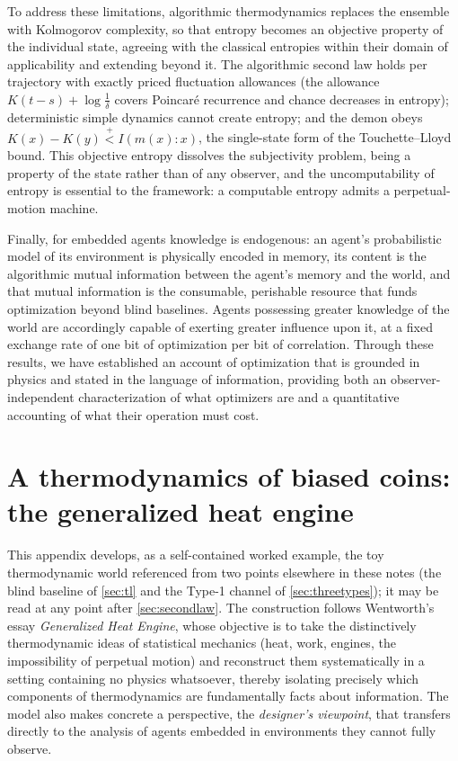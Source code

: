 \documentclass[11pt]{article}
\newcommand{\plt}{\mathrel{\stackrel{+}{<}}}
\begin{document}
To address these limitations, algorithmic thermodynamics replaces the ensemble with Kolmogorov complexity, so that entropy becomes an objective property of the individual state, agreeing with the classical entropies within their domain of applicability and extending beyond it. The algorithmic second law holds per trajectory with exactly priced fluctuation allowances (the allowance $K(t-s) + \log\frac1\delta$ covers Poincar\'e recurrence and chance decreases in entropy); deterministic simple dynamics cannot create entropy; and the demon obeys $K(x) - K(y) \plt I(m(x):x)$, the single-state form of the Touchette--Lloyd bound. This objective entropy dissolves the subjectivity problem, being a property of the state rather than of any observer, and the uncomputability of entropy is essential to the framework: a computable entropy admits a perpetual-motion machine.

Finally, for embedded agents knowledge is endogenous: an agent's probabilistic model of its environment is physically encoded in memory, its content is the algorithmic mutual information between the agent's memory and the world, and that mutual information is the consumable, perishable resource that funds optimization beyond blind baselines. Agents possessing greater knowledge of the world are accordingly capable of exerting greater influence upon it, at a fixed exchange rate of one bit of optimization per bit of correlation. Through these results, we have established an account of optimization that is grounded in physics and stated in the language of information, providing both an observer-independent characterization of what optimizers are and a quantitative accounting of what their operation must cost.

\appendix
\section{A thermodynamics of biased coins: the generalized heat engine}
\label{sec:coins}

This appendix develops, as a self-contained worked example, the toy thermodynamic world referenced from two points elsewhere in these notes (the blind baseline of \cref{sec:tl} and the Type-1 channel of \cref{sec:threetypes}); it may be read at any point after \cref{sec:secondlaw}. The construction follows Wentworth's essay \emph{Generalized Heat Engine}, whose objective is to take the distinctively thermodynamic ideas of statistical mechanics (heat, work, engines, the impossibility of perpetual motion) and reconstruct them systematically in a setting containing no physics whatsoever, thereby isolating precisely which components of thermodynamics are fundamentally facts about information. The model also makes concrete a perspective, the \emph{designer's viewpoint}, that transfers directly to the analysis of agents embedded in environments they cannot fully observe.
\end{document}
